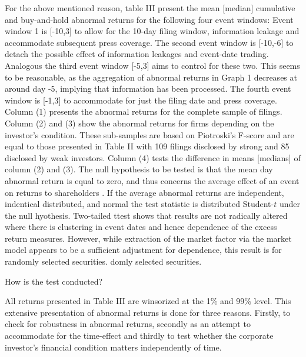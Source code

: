 \documentclass[12pt]{article}
\begin{document}
For the above mentioned reason, table III present the mean [median] cumulative and buy-and-hold abnormal returns for the following four event windows: Event window 1 is [-10,3] to allow for the 10-day filing window, information leakage and accommodate subsequent press coverage. The second event window is [-10,-6] to detach the possible effect of information leakages and event-date trading. Analogous the third event window [-5,3] aims to control for these two. This seems to be reasonable, as the aggregation of abnormal returns in Graph 1 decreases at around day -5, implying that information has been processed. The fourth event window is [-1,3] to accommodate for just the filing date and press coverage. \\
Column (1) presents the abnormal returns for the complete sample of filings. Column (2) and (3) show the abnormal returns for firms depending on the investor's condition. These sub-samples are based on Piotroski's F-score and are equal to those presented in Table II with 109 filings disclosed by strong and 85 disclosed by weak investors. Column (4) tests the difference in means [medians] of column (2) and (3). The null hypothesis to be tested is that the mean day abnormal return is equal to zero, and thus concerns the average effect of an event on returns to shareholders \citep[p.7]{Brown1985}. If the average abnormal returns are independent, indentical distributed, and normal the test statistic is distributed Student-$t$ under the null hyothesis. Two-tailed ttest 
\citet[p.15]{Brown1985} shows that results are not radically altered where there is clustering in event dates  and hence dependence of the excess return measures. 
However, while extraction of the market factor via the market model appears to be a sufficient adjustment for dependence, this result is for randomly selected securities. \citep[p.22]{Brown1985}
domly selected securities.
\begin{center}
	How is the test conducted? 
\end{center}
All returns  presented in Table III are winsorized at the 1\% and 99\% level. This extensive presentation of abnormal returns is done for three reasons. Firstly, to check for robustness in abnormal returns, secondly as an attempt to accommodate for the time-effect and thirdly to test whether the corporate investor's financial condition matters independently of time. 

\end{document}
